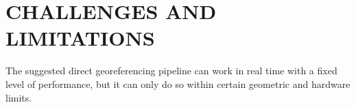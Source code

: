 \documentclass[conference]{IEEEtran}
\begin{document}



\section{CHALLENGES AND LIMITATIONS}
The suggested direct georeferencing pipeline can work in real time with a fixed level of performance, but it can only do so within certain geometric and hardware limits.
\end{document}

